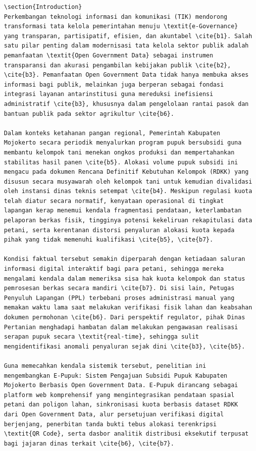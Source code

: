\documentclass[conference]{IEEEtran}
\begin{document}
\begin{lstlisting}
\section{Introduction}  
Perkembangan teknologi informasi dan komunikasi (TIK) mendorong transformasi tata kelola pemerintahan menuju \textit{e-Governance} yang transparan, partisipatif, efisien, dan akuntabel \cite{b1}. Salah satu pilar penting dalam modernisasi tata kelola sektor publik adalah pemanfaatan \textit{Open Government Data} sebagai instrumen transparansi dan akurasi pengambilan kebijakan publik \cite{b2}, \cite{b3}. Pemanfaatan Open Government Data tidak hanya membuka akses informasi bagi publik, melainkan juga berperan sebagai fondasi integrasi layanan antarinstitusi guna mereduksi inefisiensi administratif \cite{b3}, khususnya dalam pengelolaan rantai pasok dan bantuan publik pada sektor agrikultur \cite{b6}.

Dalam konteks ketahanan pangan regional, Pemerintah Kabupaten Mojokerto secara periodik menyalurkan program pupuk bersubsidi guna membantu kelompok tani menekan ongkos produksi dan mempertahankan stabilitas hasil panen \cite{b5}. Alokasi volume pupuk subsidi ini mengacu pada dokumen Rencana Definitif Kebutuhan Kelompok (RDKK) yang disusun secara musyawarah oleh kelompok tani untuk kemudian divalidasi oleh instansi dinas teknis setempat \cite{b4}. Meskipun regulasi kuota telah diatur secara normatif, kenyataan operasional di tingkat lapangan kerap menemui kendala fragmentasi pendataan, keterlambatan pelaporan berkas fisik, tingginya potensi kekeliruan rekapitulasi data petani, serta kerentanan distorsi penyaluran alokasi kuota kepada pihak yang tidak memenuhi kualifikasi \cite{b5}, \cite{b7}.

Kondisi faktual tersebut semakin diperparah dengan ketiadaan saluran informasi digital interaktif bagi para petani, sehingga mereka mengalami kendala dalam memeriksa sisa hak kuota kelompok dan status pemrosesan berkas secara mandiri \cite{b7}. Di sisi lain, Petugas Penyuluh Lapangan (PPL) terbebani proses administrasi manual yang memakan waktu lama saat melakukan verifikasi fisik lahan dan keabsahan dokumen permohonan \cite{b6}. Dari perspektif regulator, pihak Dinas Pertanian menghadapi hambatan dalam melakukan pengawasan realisasi serapan pupuk secara \textit{real-time}, sehingga sulit mengidentifikasi anomali penyaluran sejak dini \cite{b3}, \cite{b5}.

Guna memecahkan kendala sistemik tersebut, penelitian ini mengembangkan E-Pupuk: Sistem Pengajuan Subsidi Pupuk Kabupaten Mojokerto Berbasis Open Government Data. E-Pupuk dirancang sebagai platform web komprehensif yang mengintegrasikan pendataan spasial petani dan poligon lahan, sinkronisasi kuota berbasis dataset RDKK dari Open Government Data, alur persetujuan verifikasi digital berjenjang, penerbitan tanda bukti tebus alokasi terenkripsi \textit{QR Code}, serta dasbor analitik distribusi eksekutif terpusat bagi jajaran dinas terkait \cite{b6}, \cite{b7}.


\end{lstlisting}
\end{document}
